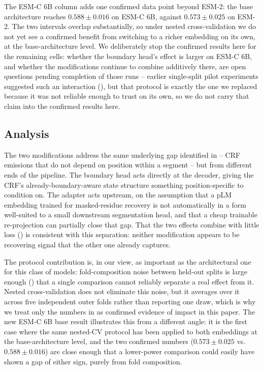 \documentclass{article}
\begin{document}
The ESM-C 6B column adds one confirmed data point beyond ESM-2: the base architecture reaches $0.588\pm0.016$ on ESM-C 6B, against $0.573\pm0.025$ on ESM-2. The two intervals overlap substantially, so under nested cross-validation we do not yet see a confirmed benefit from switching to a richer embedding on its own, at the base-architecture level. We deliberately stop the confirmed results here for the remaining cells: whether the boundary head's effect is larger on ESM-C 6B, and whether the modifications continue to combine additively there, are open questions pending completion of those runs -- earlier single-split pilot experiments suggested such an interaction (), but that protocol is exactly the one we replaced because it was not reliable enough to trust on its own, so we do not carry that claim into the confirmed results here.

\subsection{Analysis}
\label{sec:analysis}

The two modifications address the same underlying gap identified in  -- CRF emissions that do not depend on position within a segment -- but from different ends of the pipeline. The boundary head acts directly at the decoder, giving the CRF's already-boundary-aware state structure something position-specific to condition on. The adapter acts upstream, on the assumption that a pLM embedding trained for masked-residue recovery is not automatically in a form well-suited to a small downstream segmentation head, and that a cheap trainable re-projection can partially close that gap. That the two effects combine with little loss () is consistent with this separation: neither modification appears to be recovering signal that the other one already captures.

The protocol contribution is, in our view, as important as the architectural one for this class of models: fold-composition noise between held-out splits is large enough () that a single comparison cannot reliably separate a real effect from it. Nested cross-validation does not eliminate this noise, but it averages over it across five independent outer folds rather than reporting one draw, which is why we treat only the numbers in  as confirmed evidence of impact in this paper. The new ESM-C 6B base result illustrates this from a different angle: it is the first case where the same nested-CV protocol has been applied to both embeddings at the base-architecture level, and the two confirmed numbers ($0.573\pm0.025$ vs.\ $0.588\pm0.016$) are close enough that a lower-power comparison could easily have shown a gap of either sign, purely from fold composition.
\end{document}
